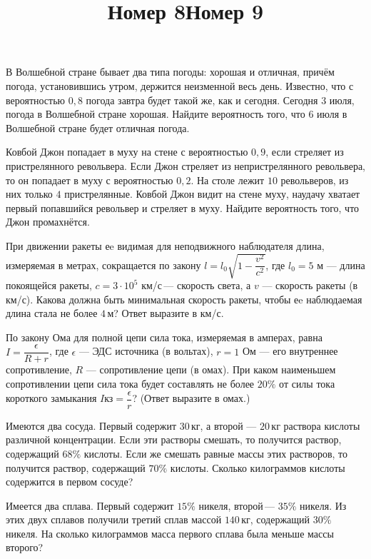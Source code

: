 \begin{consultation}
\begin{listofex}[resume]
		\item В Волшебной стране бывает два типа погоды: хорошая и отличная, причём погода, установившись утром, держится неизменной весь день. Известно, что с вероятностью \( 0,8 \) погода завтра будет такой же, как и сегодня. Сегодня \( 3 \) июля, погода в Волшебной стране хорошая. Найдите вероятность того, что \( 6 \) июля в Волшебной стране будет отличная погода.
		\item Ковбой Джон попадает в муху на стене с вероятностью \( 0,9 \), если стреляет из пристрелянного револьвера. Если Джон стреляет из непристрелянного револьвера, то он попадает в муху с вероятностью \( 0,2 \). На столе лежит \( 10 \) револьверов, из них только \( 4 \) пристрелянные. Ковбой Джон видит на стене муху, наудачу хватает первый попавшийся револьвер и стреляет в муху. Найдите вероятность того, что Джон промахнётся.
	\end{listofex}
	\title{Номер 8}
	\begin{listofex}[resume]
		\item При движении ракеты еe видимая для неподвижного наблюдателя длина, измеряемая в метрах, сокращается по закону \( l=l_0\sqrt{1-\dfrac{v^2}{c^2}} \),  где \( l_0 = 5 \) м  --- длина покоящейся ракеты, \( c=3\cdot10^5   \) км/с --- скорость света, а  \( v \) --- скорость ракеты (в км/с). Какова должна быть минимальная скорость ракеты, чтобы еe наблюдаемая длина стала не более \( 4 \) м? Ответ выразите в км/с.
		\item По закону Ома для полной цепи сила тока, измеряемая в амперах, равна \( I=\dfrac{\epsilon}{R+r} \),  где \( \epsilon \) --- ЭДС источника (в вольтах), \( r=1 \) Ом --- его внутреннее сопротивление, \( R \) --- сопротивление цепи (в омах). При каком наименьшем сопротивлении цепи сила тока будет составлять не более \( 20\% \) от силы тока короткого замыкания \( I \)кз\( =\dfrac{\epsilon}{r} \)? (Ответ выразите в омах.)
	\end{listofex}
		\title{Номер 9}
	\begin{listofex}[resume]
		\item Имеются два сосуда. Первый содержит \( 30 \) кг, а второй --- \( 20 \) кг раствора кислоты различной концентрации. Если эти растворы смешать, то получится раствор, содержащий \( 68\% \) кислоты. Если же смешать равные массы этих растворов, то получится раствор, содержащий \( 70\% \) кислоты. Сколько килограммов кислоты содержится в первом сосуде?
		\item Имеется два сплава. Первый содержит \( 15\% \) никеля, второй --- \( 35\% \) никеля. Из этих двух сплавов получили третий сплав массой \( 140 \) кг, содержащий \( 30\% \) никеля. На сколько килограммов масса первого сплава была меньше массы второго?
	\end{listofex}
\end{consultation}
